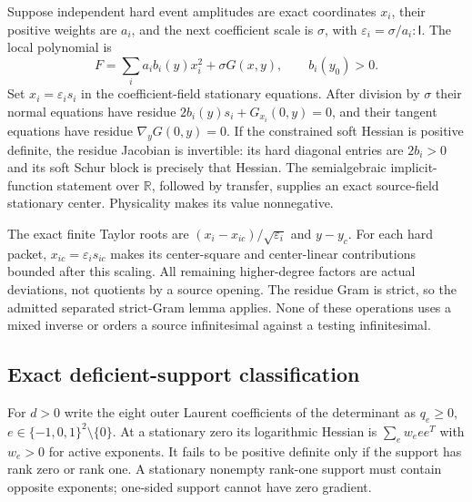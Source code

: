 \documentclass[11pt]{article}
\newcommand{\R}{\mathbb R}
\newcommand{\I}{\mathsf I}
\begin{document}
Suppose independent hard event amplitudes are exact coordinates $x_i$,
their positive weights are $a_i$, and the next coefficient scale is
$\sigma$, with $\varepsilon_i=\sigma/a_i:\I$. The local polynomial is
\[
F=\sum_i a_i b_i(y)x_i^2+\sigma G(x,y),\qquad b_i(y_0)>0.
\]
Set $x_i=\varepsilon_i s_i$ in the coefficient-field stationary
equations. After division by $\sigma$ their normal equations have
residue $2b_i(y)s_i+G_{x_i}(0,y)=0$, and their tangent equations have
residue $\nabla_yG(0,y)=0$. If the constrained soft Hessian is positive
definite, the residue Jacobian is invertible: its hard diagonal entries
are $2b_i>0$ and its soft Schur block is precisely that Hessian.
The semialgebraic implicit-function statement over $\R$, followed by
transfer, supplies an exact source-field stationary center. Physicality
makes its value nonnegative.

The exact finite Taylor roots are
$(x_i-x_{ic})/\sqrt{\varepsilon_i}$ and $y-y_c$.
For each hard packet, $x_{ic}=\varepsilon_i s_{ic}$ makes its
center-square and center-linear contributions bounded after this
scaling. All remaining higher-degree factors are actual deviations,
not quotients by a source opening. The residue Gram is strict, so the
admitted separated strict-Gram lemma applies. None of these operations
uses a mixed inverse or orders a source infinitesimal against a testing
infinitesimal.

\subsection{Exact deficient-support classification}

For $d>0$ write the eight outer Laurent coefficients of the determinant
as $q_e\ge0$, $e\in\{-1,0,1\}^2\setminus\{0\}$. At a stationary
zero its logarithmic Hessian is $\sum_e w_e ee^T$ with $w_e>0$ for
active exponents. It fails to be positive definite only if the support
has rank zero or rank one. A stationary nonempty rank-one support must
contain opposite exponents; one-sided support cannot have zero gradient.
\end{document}
